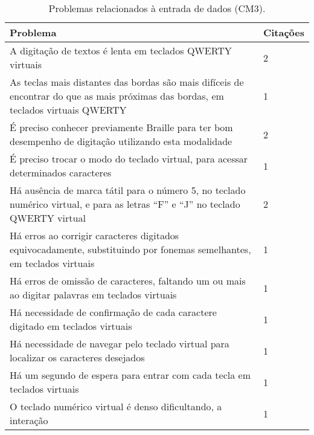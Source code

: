 \begin{table}[htb]
  \begin{center}
    \ABNTEXfontereduzida
    \caption{Problemas relacionados à entrada de dados (CM3).}
    \label{tab-pro-ent-dad-1}
    \begin{tabular}{p{13.1cm}|p{1.4cm}}
      \textbf{Problema}                                                                                                                  & \textbf{Citações} \\
      \hline
      A digitação de textos é lenta em teclados QWERTY virtuais                                                                          & 2                 \\
      \hline
      As teclas mais distantes das bordas são mais difíceis de encontrar do que as mais próximas das bordas, em teclados virtuais QWERTY & 1                 \\
      \hline
      É preciso conhecer previamente Braille para ter bom desempenho de digitação utilizando esta modalidade                             & 2                 \\
      \hline
      É preciso trocar o modo do teclado virtual, para acessar determinados caracteres                                                   & 1                 \\
      \hline
      Há ausência de marca tátil para o número 5, no teclado numérico virtual, e para as letras “F” e “J” no teclado QWERTY virtual      & 2                 \\
      \hline
      Há erros ao corrigir caracteres digitados equivocadamente, substituindo por fonemas semelhantes, em teclados virtuais              & 1                 \\
      \hline
      Há erros de omissão de caracteres, faltando um ou mais ao digitar palavras em teclados virtuais                                    & 1                 \\
      \hline
      Há necessidade de confirmação de cada caractere digitado em teclados virtuais                                                      & 1                 \\
      \hline
      Há necessidade de navegar pelo teclado virtual para localizar os caracteres desejados                                              & 1                 \\
      \hline
      Há um segundo de espera para entrar com cada tecla em teclados virtuais                                                            & 1                 \\
      \hline
      O teclado numérico virtual é denso dificultando, a interação                                                                       & 1                 \\
    \end{tabular}
  \end{center}
\end{table}

